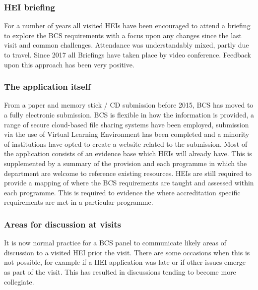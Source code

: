 \documentclass[sigconf]{acmart}
\begin{document}
\subsubsection{HEI briefing}
For a number of years all visited HEIs have been encouraged to attend a briefing to explore the BCS requirements with a focus upon any changes since the last visit and common challenges.%
Attendance was understandably mixed, partly due to travel. Since 2017 all Briefings have taken place by video conference. Feedback upon this approach has been very positive.

\subsubsection{The application itself}
From a paper and memory stick / CD submission before 2015, BCS has moved to a fully electronic submission. BCS is flexible in how the information is provided, a range of secure cloud-based file sharing systems have been employed, submission via the use of Virtual Learning Environment has been completed and a minority of institutions have opted to create a website related to the submission. Most of the application consists of an evidence base which HEIs will already have. This is supplemented by a summary of the provision and each programme in which the department are welcome to reference existing resources. HEIs are still required to provide a mapping of where the BCS requirements are taught and assessed within each programme. This is required to evidence the where accreditation specific requirements are met in a particular programme.

\subsubsection{Areas for discussion at visits}
It is now normal practice for a BCS panel to communicate likely areas of discussion to a visited HEI prior the visit. There are some occasions when this is not possible, for example if a HEI application was late or if other issues emerge as part of the visit.   This has resulted in discussions tending to become more collegiate. 
\begin{comment}
\subsection{Promoting the value of accreditation}
The value proposition discussed in this document is a definition of the value of accreditation from those who are intimately involved. BCS is in the process of initiating a conversation to explore the value proposition of accreditation from the point of view of other stakeholders.
\end{comment}
\end{document}
